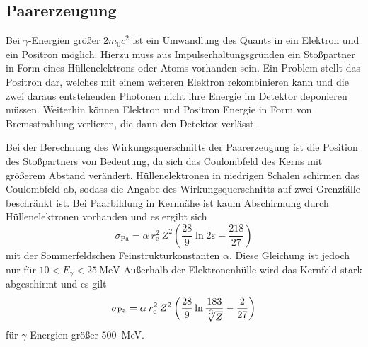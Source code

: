 \subsection{Paarerzeugung}
\label{sec:Paarerzeugung}

Bei $\gamma$-Energien größer $2 m_0 c^2$ ist ein Umwandlung des Quants in ein
Elektron und ein Positron möglich.
Hierzu muss aus Impulserhaltungsgründen ein Stoßpartner in Form eines Hüllenelektrons
oder Atoms vorhanden sein.
Ein Problem stellt das Positron dar, welches mit einem weiteren Elektron rekombinieren
kann und die zwei daraus entstehenden Photonen nicht ihre Energie im Detektor deponieren
müssen.
Weiterhin können Elektron und Positron Energie in Form von Bremsstrahlung verlieren, die dann
den Detektor verlässt.

Bei der Berechnung des Wirkungsquerschnitts der Paarerzeugung ist die Position des Stoßpartners
von Bedeutung, da sich das Coulombfeld des Kerns mit größerem Abstand verändert.
Hüllenelektronen in niedrigen Schalen schirmen das Coulombfeld ab, sodass die
Angabe des Wirkungsquerschnitts auf zwei Grenzfälle beschränkt ist.
Bei Paarbildung in Kernnähe ist kaum Abschirmung durch Hüllenelektronen vorhanden
und es ergibt sich
\begin{equation*}
	\sigma_\text{Pa} = \alpha\:r_\text{e}^2\:Z^2
	\left(\frac{28}{9} \ln2\varepsilon - \frac{218}{27}\right)
\end{equation*}
mit der Sommerfeldschen Feinstrukturkonstanten $\alpha$.
Diese Gleichung ist jedoch nur für $10 < E_\gamma < \SI{25}{\mega\electronvolt}$
Außerhalb der Elektronenhülle wird das Kernfeld stark abgeschirmt und es gilt
\begin{equation*}
	\sigma_\text{Pa} = \alpha\:r_\text{e}^2\:Z^2
	\left(\frac{28}{9} \ln\frac{183}{\sqrt[\leftroot{-1}\uproot{2}\scriptstyle 3]Z} - \frac{2}{27}\right)
\end{equation*}
für $\gamma$-Energien größer \SI{500}{\mega\electronvolt}.


